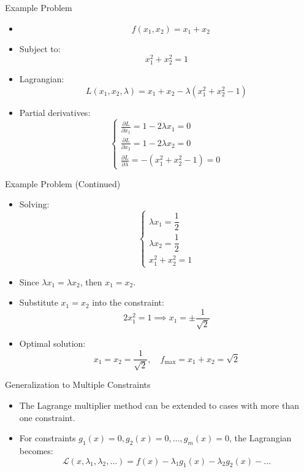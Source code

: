 \documentclass[serif, aspectratio=169]{beamer}
\begin{document}
\begin{frame}{Example Problem}
\begin{itemize}
    \item {}
        \[
 \quad f(x_1, x_2) = x_1 + x_2
\]
    \item Subject to:
    \[
x_1^2 + x_2^2 = 1
\]
    \item Lagrangian:
    \[
L(x_1, x_2, \lambda) = x_1 + x_2 - \lambda (x_1^2 + x_2^2 - 1)
\]
    \item Partial derivatives:
    \[
\begin{cases}
\frac{\partial L}{\partial x_1} = 1 - 2\lambda x_1 = 0 \\
\frac{\partial L}{\partial x_2} = 1 - 2\lambda x_2 = 0 \\
\frac{\partial L}{\partial \lambda} = -(x_1^2 + x_2^2 - 1) = 0
\end{cases}
\]
\end{itemize}
\end{frame}

\begin{frame}{Example Problem (Continued)}
\begin{itemize}
    \item Solving:
\[
\begin{cases}
\lambda x_1 = \dfrac{1}{2} \\
\lambda x_2 = \dfrac{1}{2} \\
x_1^2 + x_2^2 = 1
\end{cases}
\]
    \item Since \(\lambda x_1 = \lambda x_2\), then \(x_1 = x_2\).
    \item Substitute \(x_1 = x_2\) into the constraint:
    \[
2x_1^2 = 1 \implies x_1 = \pm \dfrac{1}{\sqrt{2}}
\]
    \item Optimal solution:
\[
x_1 = x_2 = \dfrac{1}{\sqrt{2}}, \quad f_{\text{max}} = x_1 + x_2 = \sqrt{2}
\]
\end{itemize}

\end{frame}

\begin{frame}{Generalization to Multiple Constraints}
    \begin{itemize}
    \item The Lagrange multiplier method can be extended to cases with more than one constraint.
    \item For constraints $g_1(x) = 0, g_2(x) = 0, \dots, g_m(x) = 0$, the Lagrangian becomes:
    \[
    \mathcal{L}(x, \lambda_1, \lambda_2, \dots) = f(x) - \lambda_1 g_1(x) - \lambda_2 g_2(x) - \dots
    \]
    \end{itemize}
\end{frame}
\end{document}

